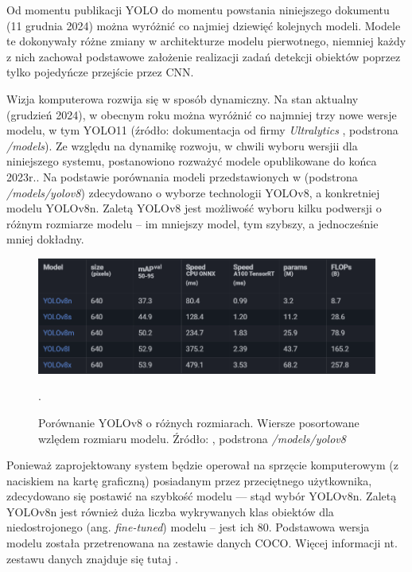 Od momentu publikacji YOLO do momentu powstania niniejszego dokumentu (11 grudnia 2024) można wyróżnić co najmiej dziewięć kolejnych modeli. Modele te dokonywały różne zmiany w architekturze modelu pierwotnego, niemniej każdy z nich zachował podstawowe założenie realizacji zadań detekcji obiektów poprzez tylko pojedyńcze przejście przez CNN. 

Wizja komputerowa rozwija się w sposób dynamiczny. Na stan aktualny (grudzień 2024), w obecnym roku można wyróżnić co najmniej trzy nowe wersje modelu, w tym YOLO11 \cite{yolo11_ultralytics} (źródło: dokumentacja od firmy \emph{Ultralytics} \cite{yolo_docs}, podstrona \emph{/models}).
Ze względu na dynamikę rozwoju, w chwili wyboru wersjii dla niniejszego systemu, postanowiono rozważyć modele opublikowane do końca 2023r.. Na podstawie porównania modeli przedstawionych w \cite{yolo_docs} (podstrona \emph{/models/yolov8}) zdecydowano o wyborze technologii YOLOv8, a konkretniej modelu YOLOv8n. Zaletą YOLOv8 jest możliwość wyboru kilku podwersji o różnym rozmiarze modelu -- im mniejszy model, tym szybszy, a jednocześnie mniej dokładny.

\begin{figure}[H]
    \centering
    \includegraphics[width=\linewidth]{r_technologie/AI_assets/yolo8_sizes.png}
    \caption{Porównanie YOLOv8 o różnych rozmiarach. Wiersze posortowane wzlędem rozmiaru modelu. Źródło: \cite{yolo_docs}, podstrona \emph{/models/yolov8}}.
    \label{fig:yolo8-sizes}
\end{figure}

Ponieważ zaprojektowany system będzie operował na sprzęcie komputerowym (z naciskiem na kartę graficzną) posiadanym przez przeciętnego użytkownika, zdecydowano się postawić na szybkość modelu --- stąd wybór YOLOv8n. 
Zaletą YOLOv8n jest również duża liczba wykrywanych klas obiektów dla niedostrojonego (ang. \emph{fine-tuned}) modelu -- jest ich 80. Podstawowa wersja modelu została przetrenowana na zestawie danych COCO. Więcej informacji nt. zestawu danych znajduje się tutaj \cite{COCO_docs}. 


